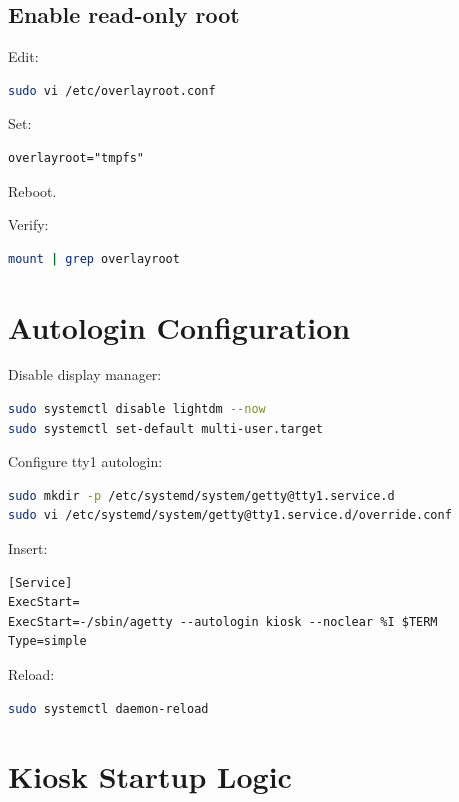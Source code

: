 \documentclass[11pt,letterpaper]{article}
\begin{document}
\subsection{Enable read-only root}

Edit:

\begin{lstlisting}[language=bash]
sudo vi /etc/overlayroot.conf
\end{lstlisting}

Set:

\begin{lstlisting}
overlayroot="tmpfs"
\end{lstlisting}

Reboot.

Verify:

\begin{lstlisting}[language=bash]
mount | grep overlayroot
\end{lstlisting}

\section{Autologin Configuration}

Disable display manager:

\begin{lstlisting}[language=bash]
sudo systemctl disable lightdm --now
sudo systemctl set-default multi-user.target
\end{lstlisting}

Configure tty1 autologin:

\begin{lstlisting}[language=bash]
sudo mkdir -p /etc/systemd/system/getty@tty1.service.d
sudo vi /etc/systemd/system/getty@tty1.service.d/override.conf
\end{lstlisting}

Insert:

\begin{lstlisting}
[Service]
ExecStart=
ExecStart=-/sbin/agetty --autologin kiosk --noclear %I $TERM
Type=simple
\end{lstlisting}

Reload:

\begin{lstlisting}[language=bash]
sudo systemctl daemon-reload
\end{lstlisting}

\section{Kiosk Startup Logic}
\end{document}
